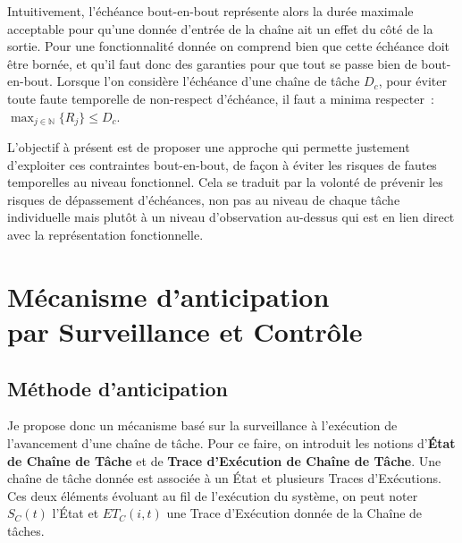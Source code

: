 \documentclass[french, a4paper, 11pt, twoside, pdftex]{StyleThese}
\begin{document}
	Intuitivement, l'échéance bout-en-bout représente alors la durée maximale acceptable pour qu'une donnée d'entrée de la chaîne ait un effet du côté de la sortie. Pour une fonctionnalité donnée on comprend bien que cette échéance doit être bornée, et qu'il faut donc des garanties pour que tout se passe bien de bout-en-bout. Lorsque l'on considère l'échéance d'une chaîne de tâche $D_c$, pour éviter toute faute temporelle de non-respect d'échéance, il faut a minima respecter~:  $\max_{j \in \mathbb{N}}\{R_j\} \leq D_c$.
	
	\smallbreak 
	
	L'objectif à présent est de proposer une approche qui permette justement d'exploiter ces contraintes bout-en-bout, de façon à éviter les risques de fautes temporelles au niveau fonctionnel. Cela se traduit par la volonté de prévenir les risques de dépassement d'échéances, non pas au niveau de chaque tâche individuelle mais plutôt à un niveau d'observation au-dessus qui est en lien direct avec la représentation fonctionnelle.
	
    
\section[Mécanisme d'anticipation]{Mécanisme d'anticipation \\ par Surveillance et Contrôle}
    \subsection{Méthode d'anticipation}
    
    Je propose donc un mécanisme basé sur la surveillance à l'exécution de l'avancement d'une chaîne de tâche. 
    Pour ce faire, on introduit les notions d'\textbf{État de Chaîne de Tâche} et de \textbf{Trace d'Exécution de Chaîne de Tâche}. Une chaîne de tâche donnée est associée à un État et plusieurs Traces d'Exécutions. Ces deux éléments évoluant au fil de l'exécution du système, on peut noter $S_C(t)$ l'État et $ET_C(i,t)$ une Trace d'Exécution donnée de la Chaîne de tâches.
    
\end{document}
